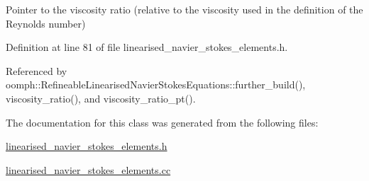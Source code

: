 Pointer to the viscosity ratio (relative to the viscosity used in the definition of the Reynolds number) 



Definition at line 81 of file linearised\+\_\+navier\+\_\+stokes\+\_\+elements.\+h.



Referenced by oomph\+::\+Refineable\+Linearised\+Navier\+Stokes\+Equations\+::further\+\_\+build(), viscosity\+\_\+ratio(), and viscosity\+\_\+ratio\+\_\+pt().



The documentation for this class was generated from the following files\+:\begin{DoxyCompactItemize}
\item 
\hyperlink{linearised__navier__stokes__elements_8h}{linearised\+\_\+navier\+\_\+stokes\+\_\+elements.\+h}\item 
\hyperlink{linearised__navier__stokes__elements_8cc}{linearised\+\_\+navier\+\_\+stokes\+\_\+elements.\+cc}\end{DoxyCompactItemize}
